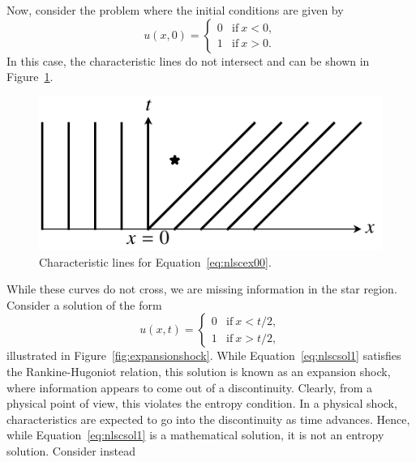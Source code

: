 Now, consider the problem where the initial conditions are given by
\begin{equation}
	u(x,0) = 
	\begin{cases}
		0 & \text{if}~x < 0,\\
		1 & \text{if}~x > 0. 
	\end{cases}
	\label{eq:nlscex00}
\end{equation}
In this case, the characteristic lines do not intersect and can be shown in Figure~\ref{fig:nlscex2}. 
\begin{figure}[htbp]
	\centering
	\includegraphics[width=0.4\linewidth]{Pictures/nonlinear_scalar_entropycond_0}
	\caption{Characteristic lines for Equation~\ref{eq:nlscex00}.}
	\label{fig:nlscex2}
\end{figure}
While these curves do not cross, we are missing information in the star region.  Consider a solution of the form
\begin{equation}
	u(x,t) = 
	\begin{cases}
		0 & \text{if}~x < t/2,\\
		1 & \text{if}~x > t/2,
	\end{cases}
	\label{eq:nlscsol1}
\end{equation}
illustrated in Figure~\ref{fig:expansionshock}. While Equation~\ref{eq:nlscsol1} satisfies the Rankine-Hugoniot relation, this solution is known as an expansion shock, where information appears to come out of a discontinuity. Clearly, from a physical point of view, this violates the entropy condition. In a physical shock, characteristics are expected to go into the discontinuity as time advances. Hence, while Equation~\ref{eq:nlscsol1} is a mathematical solution, it is not an entropy solution. Consider instead 
